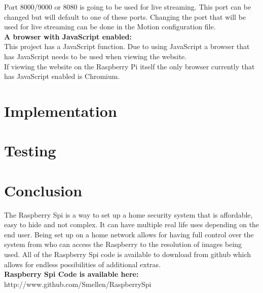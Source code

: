 \documentclass[]{report}
\begin{document}
Port 8000/9000 or 8080 is going to be used for live streaming. This port can be changed but will default to one of these ports. Changing the port that will be used for live streaming can be done in the Motion configuration file.\\


{\bf A browser with JavaScript enabled:}\\

This project has a JavaScript function. Due to using JavaScript a browser that has JavaScript needs to be used when viewing the website.\\

If viewing the website on the Raspberry Pi itself the only browser currently that has JavaScript enabled is Chromium.\\
%
%
\chapter {Implementation}
\label {ch:implem}
\chapter {Testing}
\label {ch:test}
%
%
%
%
%
\chapter {Conclusion}
\label {ch:concl}
%
%
%
%
%
\begin{small}
 The Raspberry Spi is a way to set up a home security system that is affordable, easy to hide and not complex. It can have multiple real life uses depending on the end user. Being set up on a home network allows for having full control over the system from who can access the Raspberry to the resolution of images being used. All of the Raspberry Spi code is available to download from github which allows for endless possibilities of additional extras.\\

{\bf Raspberry Spi Code is available here:\\}
{http://www.github.com/Smellen/RaspberrySpi}
\end{small}

\end{document}
